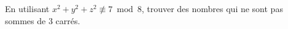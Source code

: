 En utilisant $x^2 + y^2 + z^2 \not\equiv 7 \bmod 8$, trouver des nombres qui ne sont pas sommes de $3$ carrés.
